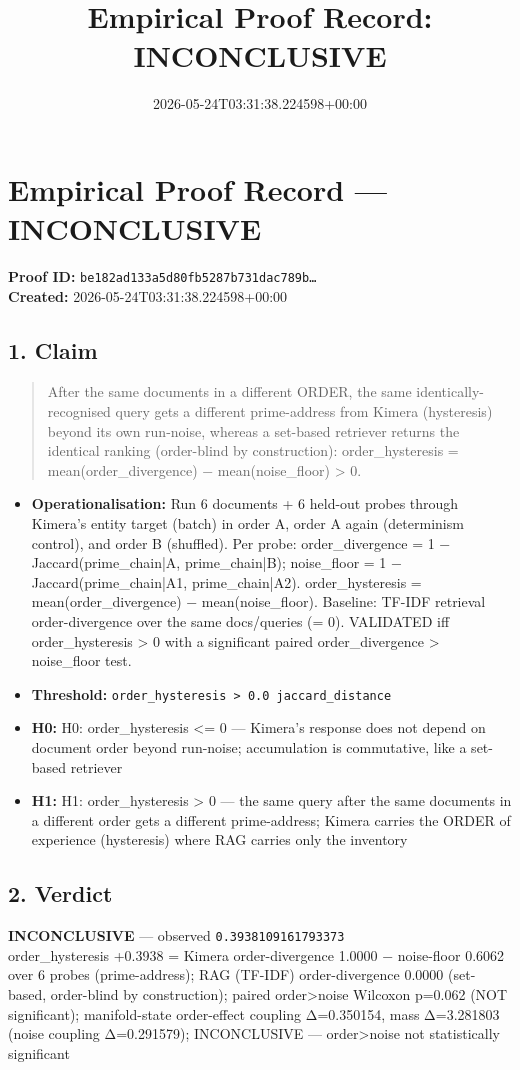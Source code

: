 \documentclass{article}
\title{Empirical Proof Record: INCONCLUSIVE}
\date{2026-05-24T03:31:38.224598+00:00}
\begin{document}
\maketitle
\section*{Empirical Proof Record --- \textcolor{inconclusive}{\textbf{INCONCLUSIVE}}}
\textbf{Proof ID:} \texttt{be182ad133a5d80fb5287b731dac789b\dots}\\
\textbf{Created:} 2026-05-24T03:31:38.224598+00:00
\subsection*{1. Claim}
\begin{quote}After the same documents in a different ORDER, the same identically-recognised query gets a different prime-address from Kimera (hysteresis) beyond its own run-noise, whereas a set-based retriever returns the identical ranking (order-blind by construction): order\_hysteresis = mean(order\_divergence) − mean(noise\_floor) > 0.\end{quote}
\begin{itemize}
\item \textbf{Operationalisation:} Run 6 documents + 6 held-out probes through Kimera's entity target (batch) in order A, order A again (determinism control), and order B (shuffled). Per probe: order\_divergence = 1 − Jaccard(prime\_chain|A, prime\_chain|B); noise\_floor = 1 − Jaccard(prime\_chain|A1, prime\_chain|A2). order\_hysteresis = mean(order\_divergence) − mean(noise\_floor). Baseline: TF-IDF retrieval order-divergence over the same docs/queries (= 0). VALIDATED iff order\_hysteresis > 0 with a significant paired order\_divergence > noise\_floor test.
\item \textbf{Threshold:} \texttt{order\_hysteresis > 0.0 jaccard\_distance}
\item \textbf{H0:} H0: order\_hysteresis <= 0 — Kimera's response does not depend on document order beyond run-noise; accumulation is commutative, like a set-based retriever
\item \textbf{H1:} H1: order\_hysteresis > 0 — the same query after the same documents in a different order gets a different prime-address; Kimera carries the ORDER of experience (hysteresis) where RAG carries only the inventory
\end{itemize}
\subsection*{2. Verdict}
\textcolor{inconclusive}{\textbf{INCONCLUSIVE}} --- observed \texttt{0.3938109161793373}\\
order\_hysteresis +0.3938 = Kimera order-divergence 1.0000 − noise-floor 0.6062 over 6 probes (prime-address); RAG (TF-IDF) order-divergence 0.0000 (set-based, order-blind by construction); paired order>noise Wilcoxon p=0.062 (NOT significant); manifold-state order-effect coupling Δ=0.350154, mass Δ=3.281803 (noise coupling Δ=0.291579); INCONCLUSIVE — order>noise not statistically significant
\end{document}
